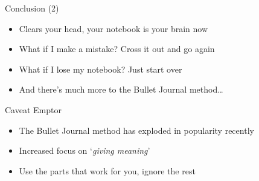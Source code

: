 \documentclass[aspectratio=169]{beamer}
\begin{document}
    {
    \begin{frame}{Conclusion (2)}
        \begin{itemize}
            \item Clears your head, your notebook is your brain now
            \item What if I make a mistake? \pause Cross it out and go again \pause
            \item What if I lose my notebook? \pause Just start over \pause
            \item And there's much more to the Bullet Journal method\ldots{}
        \end{itemize}
    \end{frame}
    }

    {
    \begin{frame}{Caveat Emptor}
        \begin{itemize}
            \item The Bullet Journal method has exploded in popularity recently
            \item Increased focus on `\emph{giving meaning}'
            \item Use the parts that work for you, ignore the rest
        \end{itemize}
    \end{frame}
    }
\end{document}
